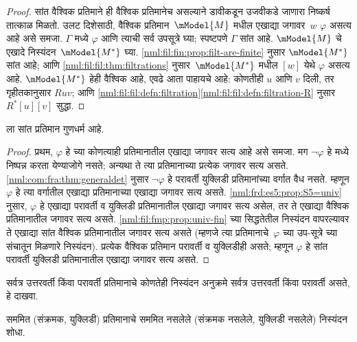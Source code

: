 \begin{proof}
  सांत वैश्विक प्रतिमाने ही वैश्विक प्रतिमानेच
  असल्याने डावीकडून उजवीकडे जाणारा निष्कर्ष
  तात्काळ मिळतो. उलट दिशेसाठी, वैश्विक
  प्रतिमान~$\mModel{M}$ मधील एखाद्या जगावर~$w$
  $\varphi$ असत्य आहे असे समजा. $\Gamma$ मध्ये $\varphi$
  आणि त्याची सर्व उपसूत्रे घ्या; स्पष्टपणे $\Gamma$
  सांत आहे. $\mModel{M}$ चे एखादे निस्यंदन~$\mModel{M^*}$
  घ्या. \ref{nml:fil:fin:prop:filt-are-finite} नुसार
  $\mModel{M^*}$ सांत आहे; आणि
  \ref{nml:fil:fil:thm:filtrations} नुसार~$\mModel{M^*}$
  मधील $[w]$ येथे $\varphi$ असत्य आहे. $\mModel{M^*}$
  हेही वैश्विक आहे, एवढे आता पाहायचे आहे:
  कोणतीही $u$ आणि $v$ दिली, तर गृहीतकानुसार
  $Ruv$; आणि
  \ref{nml:fil:fil:defn:filtration}\ref{nml:fil:fil:defn:filtration-R}
  नुसार $R^*[u][v]$ सुद्धा.
\end{proof}

\begin{cor}\label{nml:fil:fmp:cor:S5fmp}
   ला सांत प्रतिमान गुणधर्म आहे.
\end{cor}

\begin{proof}
  प्रथम, $\varphi$ हे  च्या कोणत्याही प्रतिमानातील एखाद्या
  जगावर सत्य आहे असे समजा. मग $\lnot\varphi$ हे  मध्ये
  निष्पन्न करता येण्याजोगे नसते; अन्यथा ते त्या प्रतिमानाच्या प्रत्येक जगावर
  सत्य असते. \ref{nml:com:fra:thm:generaldet} नुसार $\lnot\varphi$
  हे परावर्ती युक्लिडी प्रतिमानांच्या वर्गात वैध नसते. म्हणून $\varphi$
  हे त्या वर्गातील एखाद्या प्रतिमानाच्या एखाद्या जगावर सत्य असते.
  \ref{nml:frd:es5:prop:S5=univ} नुसार,
  $\varphi$ हे एखाद्या परावर्ती व युक्लिडी प्रतिमानातील
  एखाद्या जगावर सत्य असेल, तर ते एखाद्या वैश्विक
  प्रतिमानातील जगावर सत्य असते.
  \ref{nml:fil:fmp:prop:univ-fin} च्या सिद्धतेतील निस्यंदन वापरल्यावर
  ते एखाद्या सांत
  वैश्विक प्रतिमानातील जगावर सत्य असते
  (म्हणजे त्या प्रतिमानाचे~$\varphi$ च्या उप-सूत्रे
  च्या संचातून मिळणारे निस्यंदन).
  प्रत्येक वैश्विक प्रतिमान परावर्ती व युक्लिडीही असते;
  म्हणून $\varphi$ हे सांत परावर्ती युक्लिडी प्रतिमानातील
  एखाद्या जगावर सत्य असते.
\end{proof}

\begin{prob}
  सर्वत्र उत्तरवर्ती किंवा परावर्ती प्रतिमानाचे
  कोणतेही निस्यंदन अनुक्रमे सर्वत्र उत्तरवर्ती किंवा
  परावर्ती असते, हे दाखवा.
\end{prob}

\begin{prob}
  सममित (संक्रमक, युक्लिडी) प्रतिमानाचे
  सममित नसलेले (संक्रमक नसलेले, युक्लिडी नसलेले)
  निस्यंदन शोधा.
\end{prob}













